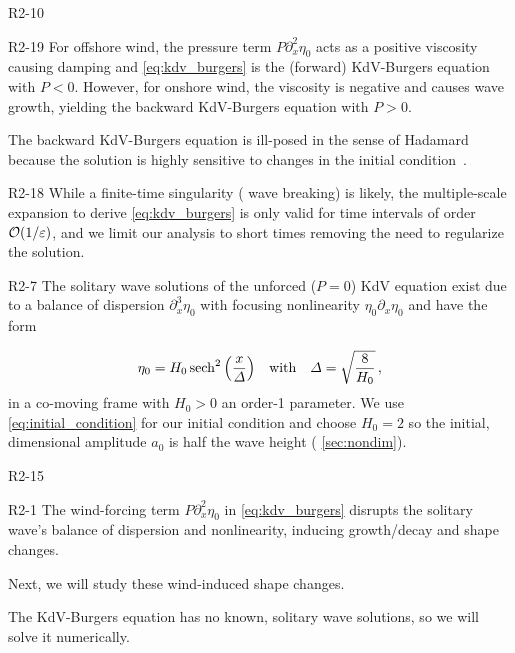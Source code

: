 \documentclass{jfm}
\renewcommand*{\epsilon}{\varepsilon}
\begin{document}
\begin{LineLabel}{R2-10}
\begin{LineLabel}{R2-19}
For offshore wind, the pressure term $P \partial^2_x \eta_0$ acts as a
positive viscosity causing damping and \cref{eq:kdv_burgers} is the
(forward) KdV-Burgers equation with $P<0$.
However, for onshore wind, the viscosity is negative and causes wave
growth, yielding the backward KdV-Burgers equation with $P>0$.
\end{LineLabel}
The backward KdV-Burgers equation is ill-posed in the sense of Hadamard
because the solution is highly sensitive to changes in the initial
condition~\citep{hadamard1902problemes}.
\begin{LineLabel}{R2-18}
While a finite-time singularity (\ie{} wave breaking) is likely, the
multiple-scale expansion to derive \cref{eq:kdv_burgers} is only valid
for time intervals of order $\order{1/\epsilon}$, and we limit our
analysis to short times removing the need to regularize the solution.
\end{LineLabel}
\end{LineLabel}

\begin{LineLabel}{R2-7}
The solitary wave solutions of the unforced ($P=0$) KdV equation exist
due to a balance of dispersion $\partial_x^3 \eta_0$ with focusing
nonlinearity $\eta_0 \partial_x \eta_0$ and have the
form~\citep[\eg][]{mei2005nonlinear}
\end{LineLabel}
\begin{equation}
  \eta_0 = H_0 \sech^2\pqty{\frac{x}{\Delta}}
  \qq{with}
  \Delta = \sqrt{\frac{8}{H_0}} \,,
  \label{eq:initial_condition}
\end{equation}
in a co-moving frame with $H_0>0$ an order-1 parameter.
We use \cref{eq:initial_condition} for our initial condition and choose
$H_0 = 2$ so the initial, dimensional amplitude $a_0$ is half the wave
height (\cf{} \cref{sec:nondim}).
\begin{LineLabel}{R2-15}
\begin{LineLabel}{R2-1}
The wind-forcing term $P \partial_x^2 \eta_0$ in \cref{eq:kdv_burgers}
disrupts the solitary wave's balance of dispersion and nonlinearity,
inducing growth/decay and shape changes.
\end{LineLabel}
Next, we will study these wind-induced shape changes.
\end{LineLabel}
The KdV-Burgers equation has no known, solitary wave solutions, so we
will solve it numerically.
\end{document}
